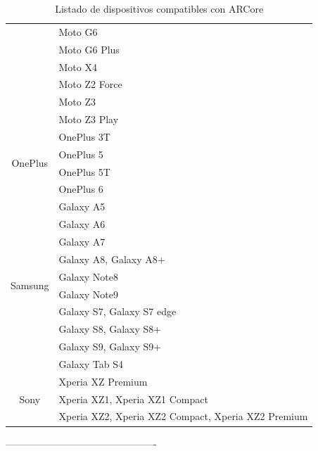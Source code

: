 \begin{table}[]
\begin{tabular}{|c|l|}
		& Moto G6                                            \\ \cline{2-2} 
		& Moto G6 Plus                                       \\ \cline{2-2} 
		& Moto X4                                            \\ \cline{2-2} 
		& Moto Z2 Force                                      \\ \cline{2-2} 
		& Moto Z3                                            \\ \cline{2-2} 
		& Moto Z3 Play                                       \\ \hline
		\multirow{4}{*}{OnePlus}    & OnePlus 3T                                         \\ \cline{2-2} 
		& OnePlus 5                                          \\ \cline{2-2} 
		& OnePlus 5T                                         \\ \cline{2-2} 
		& OnePlus 6                                          \\ \hline
		\multirow{10}{*}{Samsung}   & Galaxy A5                                          \\ \cline{2-2} 
		& Galaxy A6                                          \\ \cline{2-2} 
		& Galaxy A7                                          \\ \cline{2-2} 
		& Galaxy A8, Galaxy A8+                              \\ \cline{2-2} 
		& Galaxy Note8                                       \\ \cline{2-2} 
		& Galaxy Note9                                       \\ \cline{2-2} 
		& Galaxy S7, Galaxy S7 edge                          \\ \cline{2-2} 
		& Galaxy S8, Galaxy S8+                              \\ \cline{2-2} 
		& Galaxy S9, Galaxy S9+                              \\ \cline{2-2} 
		& Galaxy Tab S4                                      \\ \hline
		\multirow{3}{*}{Sony}       & Xperia XZ Premium                                  \\ \cline{2-2} 
		& Xperia XZ1, Xperia XZ1 Compact                     \\ \cline{2-2} 
		& Xperia XZ2, Xperia XZ2 Compact, Xperia XZ2 Premium \\ \hline
	\end{tabular}

\captionsetup{justification=centering}
\caption{Listado de dispositivos compatibles con ARCore}
\end{table}


----------------------------------------------